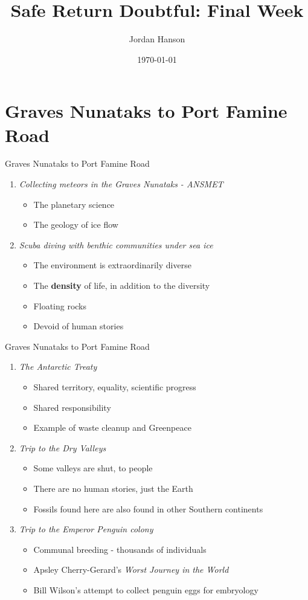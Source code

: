 \documentclass{beamer}
\title{Safe Return Doubtful: Final Week}
\date{\today}
\author{Jordan Hanson}
\institute{Whittier College Department of Physics and Astronomy}
\begin{document}
\maketitle

\section{Graves Nunataks to Port Famine Road}

\begin{frame}{Graves Nunataks to Port Famine Road}
\begin{enumerate}
\item \textit{Collecting meteors in the Graves Nunataks - ANSMET}
\begin{itemize}
\item The planetary science
\item The geology of ice flow
\end{itemize}
\item \textit{Scuba diving with benthic communities under sea ice}
\begin{itemize}
\item The environment is extraordinarily diverse
\item The \textbf{density} of life, in addition to the diversity
\item Floating rocks
\item Devoid of human stories
\end{itemize}
\end{enumerate}
\end{frame}

\begin{frame}{Graves Nunataks to Port Famine Road}
\begin{enumerate}
\item \textit{The Antarctic Treaty}
\begin{itemize}
\item Shared territory, equality, scientific progress
\item Shared responsibility
\item Example of waste cleanup and Greenpeace
\end{itemize}
\item \textit{Trip to the Dry Valleys}
\begin{itemize}
\item Some valleys are shut, to people
\item There are no human stories, just the Earth
\item Fossils found here are also found in other Southern continents
\end{itemize}
\item \textit{Trip to the Emperor Penguin colony}
\begin{itemize}
\item Communal breeding - thousands of individuals
\item Apsley Cherry-Gerard's \textit{Worst Journey in the World}
\item Bill Wilson's attempt to collect penguin eggs for embryology
\end{itemize}
\end{enumerate}
\end{frame}
\end{document}

